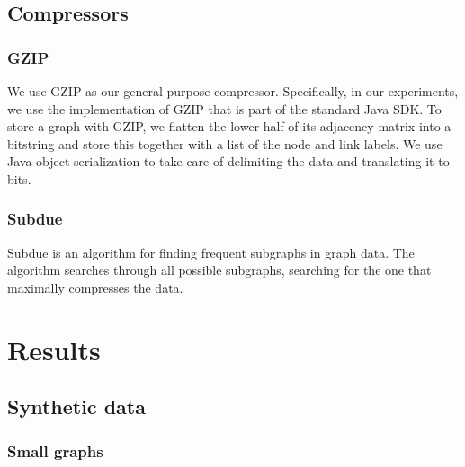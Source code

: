 \documentclass[10pt,a4paper,oneside]{article}
\begin{document}
\subsection*{Compressors}

\subsubsection*{GZIP}

We use GZIP as our general purpose compressor. Specifically, in our experiments, we use the implementation of GZIP that is part of the standard Java SDK. To store a graph with GZIP, we flatten the lower half of its adjacency matrix into a bitstring and store this together with a list of the node and link labels. We use Java object serialization to take care of delimiting the data and translating it to bits.   

\subsubsection*{Subdue}

Subdue \cite{} is an algorithm for finding frequent subgraphs in graph data. The algorithm searches through all possible subgraphs, searching for the  one that maximally compresses the data. 

\section*{Results}

\subsection*{Synthetic data}

\subsubsection*{Small graphs}
\end{document}
